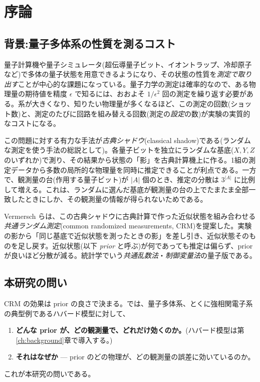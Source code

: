 \chapter{序論}
\label{ch:intro}

\section{背景:量子多体系の性質を測るコスト}

量子計算機や量子シミュレータ(超伝導量子ビット、イオントラップ、冷却原子など)で多体の量子状態を用意できるようになり、その状態の性質を\emph{測定で取り出す}ことが中心的な課題になっている。量子力学の測定は確率的なので、ある物理量の期待値を精度 $\epsilon$ で知るには、おおよそ $1/\epsilon^2$ 回の測定を繰り返す必要がある。系が大きくなり、知りたい物理量が多くなるほど、この測定の回数(ショット数)と、測定のたびに回路を組み替える回数(測定の\emph{設定}の数)が実験の実質的なコストになる。

この問題に対する有力な手法が\emph{古典シャドウ}(classical shadow)\cite{huang2020}である(ランダムな測定を使う手法の総説として\cite{elben2023})。各量子ビットを独立にランダムな基底($X,Y,Z$ のいずれか)で測り、その結果から状態の「影」を古典計算機上に作る。1組の測定データから多数の局所的な物理量を同時に推定できることが利点である。一方で、観測量の台(作用する量子ビット)が $\lvert A\rvert$ 個のとき、推定の分散は $3^{\lvert A\rvert}$ に比例して増える。これは、ランダムに選んだ基底が観測量の台の上でたまたま全部一致したときにしか、その観測量の情報が得られないためである。

Vermersch らは、この古典シャドウに古典計算で作った近似状態を組み合わせる\emph{共通ランダム測定}(common randomized measurements, CRM)を提案した\cite{vermersch2024}。実験の影から「同じ基底で近似状態を測ったときの影」を差し引き、近似状態そのものを足し戻す。近似状態(以下 \emph{prior} と呼ぶ)が何であっても推定は偏らず、prior が良いほど分散が減る。統計学でいう\emph{共通乱数法}・\emph{制御変量法}の量子版である。

\section{本研究の問い}

CRM の効果は prior の良さで決まる。では、量子多体系、とくに強相関電子系の典型例であるハバード模型に対して、
\begin{enumerate}
  \item \textbf{どんな prior が、どの観測量で、どれだけ効くのか。}(ハバード模型\cite{hubbard1963}は第\ref{ch:background}章で導入する。)
  \item \textbf{それはなぜか} — prior のどの物理が、どの観測量の誤差に効いているのか。
\end{enumerate}
これが本研究の問いである。

